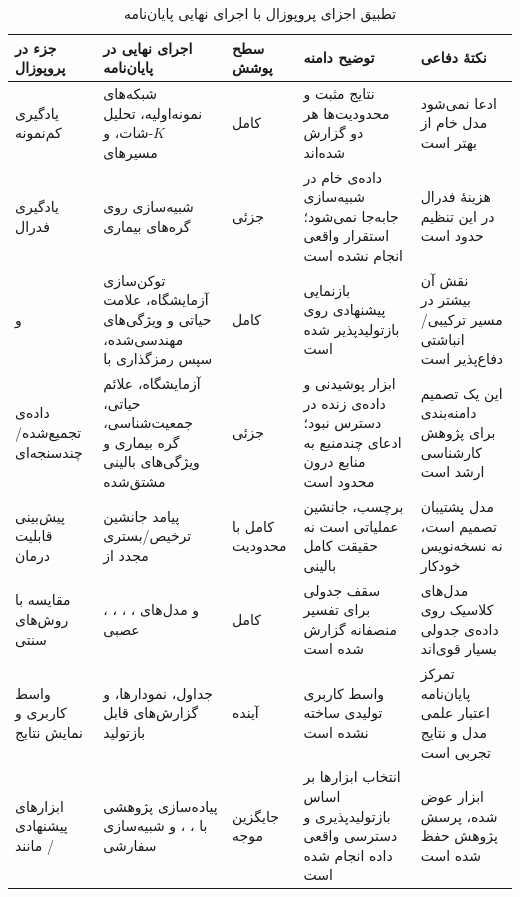 \begin{table}[htbp]
\centering
\caption{تطبیق اجزای پروپوزال با اجرای نهایی پایان‌نامه}
\footnotesize
\setlength{\tabcolsep}{1.8pt}
\renewcommand{\arraystretch}{1.12}
\begin{tabularx}{\linewidth}{@{}R{2.25cm}R{2.85cm}C{1.35cm}R{3.05cm}Y@{}}
\toprule
\textbf{جزء در پروپوزال} & \textbf{اجرای نهایی در پایان‌نامه} & \textbf{سطح پوشش} & \textbf{توضیح دامنه} & \textbf{نکتۀ دفاعی} \\
\midrule
یادگیری کم‌نمونه & شبکه‌های نمونه‌اولیه، تحلیل $K$-شات،  و مسیرهای  & کامل & نتایج مثبت و محدودیت‌ها هر دو گزارش شده‌اند & ادعا نمی‌شود مدل خام از  بهتر است \\
یادگیری فدرال & شبیه‌سازی  روی گره‌های بیماری & جزئی & داده‌ی خام در شبیه‌سازی جابه‌جا نمی‌شود؛ استقرار واقعی انجام نشده است & هزینۀ فدرال در این تنظیم حدود   است \\
 و  & توکن‌سازی  آزمایشگاه،  علامت حیاتی و ویژگی‌های مهندسی‌شده، سپس رمزگذاری با  & کامل & بازنمایی پیشنهادی روی  بازتولیدپذیر شده است & نقش آن بیشتر در مسیر ترکیبی/انباشتی دفاع‌پذیر است \\
داده‌ی تجمیع‌شده/چندسنجه‌ای & آزمایشگاه، علائم حیاتی، جمعیت‌شناسی، گره بیماری و ویژگی‌های بالینی مشتق‌شده & جزئی & ابزار پوشیدنی و داده‌ی زنده در دسترس نبود؛ ادعای چندمنبع به منابع درون  محدود است & این یک تصمیم دامنه‌بندی برای پژوهش کارشناسی ارشد است \\
پیش‌بینی قابلیت درمان & پیامد جانشین ترخیص/بستری مجدد از  & کامل با محدودیت & برچسب، جانشین عملیاتی است نه حقیقت کامل بالینی & مدل پشتیبان تصمیم است، نه نسخه‌نویس خودکار \\
مقایسه با روش‌های سنتی & ، ، ، ،  و مدل‌های عصبی & کامل & سقف جدولی برای تفسیر منصفانه گزارش شده است & مدل‌های کلاسیک روی داده‌ی جدولی بسیار قوی‌اند \\
واسط کاربری و نمایش نتایج & جداول، نمودارها،  و گزارش‌های قابل بازتولید & آینده & واسط کاربری تولیدی ساخته نشده است & تمرکز پایان‌نامه اعتبار علمی مدل و نتایج تجربی است \\
ابزارهای پیشنهادی مانند / & پیاده‌سازی پژوهشی با ، ،  و شبیه‌سازی سفارشی  & جایگزین موجه & انتخاب ابزارها بر اساس بازتولیدپذیری و دسترسی واقعی داده انجام شده است & ابزار عوض شده، پرسش پژوهش حفظ شده است \\
\bottomrule
\end{tabularx}
\label{tab:proposal_alignment}
\end{table}

